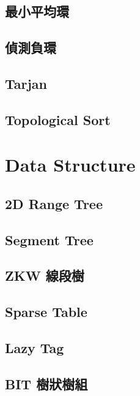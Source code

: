 \subsection{最小平均環}

\subsection{偵測負環}

\subsection{Tarjan}

\subsection{Topological Sort}


\section{Data Structure}

\subsection{2D Range Tree}


\subsection{Segment Tree}

\subsection{ZKW 線段樹}

\subsection{Sparse Table}

\subsection{Lazy Tag}

\subsection{BIT 樹狀樹組}


